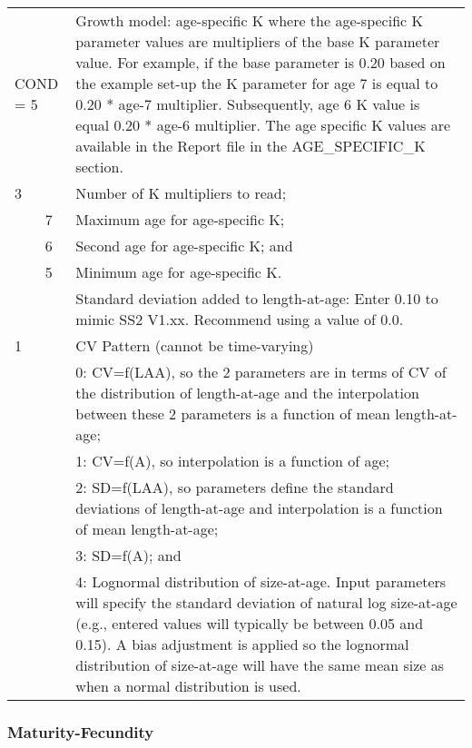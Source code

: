 \begin{longtable}{p{0.5cm} p{2cm} p{12.5cm}}
	\multicolumn{2}{l}{COND = 5} & Growth model: age-specific K where the age-specific K parameter values are multipliers of the base K parameter value. For example, if the base parameter is 0.20 based on the example set-up the K parameter for age 7 is equal to 0.20 * age-7 multiplier. Subsequently, age 6 K value is equal 0.20 * age-6 multiplier. The age specific K values are available in the Report file in the AGE\_SPECIFIC\_K section. \Tstrut\\
	3 & & Number of K multipliers to read; \\
	& 7 & Maximum age for age-specific K; \\
	& 6 & Second age for age-specific K; and \\
	& 5 & Minimum age for age-specific K. \Bstrut\\
	\hline

	\Tstrut 0 & & Standard deviation added to length-at-age: Enter 0.10 to mimic SS2 V1.xx. Recommend using a value of 0.0. \Bstrut\\
	\hline

	1 & & CV Pattern (cannot be time-varying) \Tstrut\\
	  & & 0: CV=f(LAA), so the 2 parameters are in terms of CV of the distribution of length-at-age and the interpolation between these 2 parameters is a function of mean length-at-age; \\
	  & & 1: CV=f(A), so interpolation is a function of age; \\
	  & & 2: SD=f(LAA), so parameters define the standard deviations of length-at-age and interpolation is a function of mean length-at-age; \\
	  & & 3: SD=f(A); and \\
	  & & 4: Lognormal distribution of size-at-age. Input parameters will specify the standard deviation of natural log size-at-age (e.g., entered values will typically be between 0.05 and 0.15). A bias adjustment is applied so the lognormal distribution of size-at-age will have the same mean size as when a normal distribution is used. \Bstrut\\
	\hline
\end{longtable}


\subsubsection{Maturity-Fecundity}

